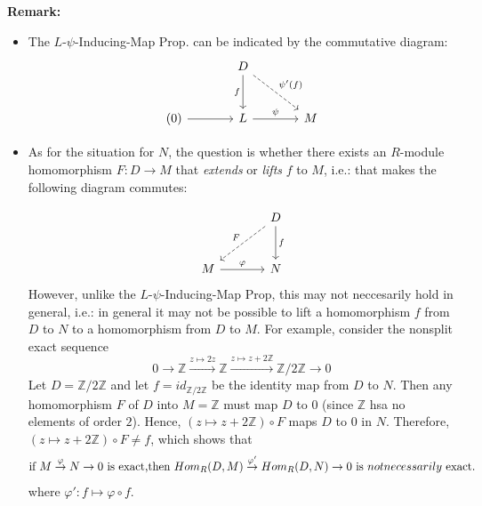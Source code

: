 \noindent\textbf{Remark:} \begin{itemize}
    \item The $L$-$\psi$-Inducing-Map Prop. can be indicated by the commutative diagram:
    \[
    \begin{tikzcd}[row sep=large, column sep=large]
    & D \arrow[d, "f"'] \arrow[rd, dashed, "\psi' (f)"] \\
    (0 \arrow[r]) & L \arrow[r, "\psi"] & M
    \end{tikzcd}
    \]

    \item As for the situation for $N$, the question is whether there exists an $R$-module homomorphism $F: D \to M$ that \textit{extends} or \textit{lifts} $f$ to $M$, i.e.: that makes the following diagram commutes:

    \[
    \begin{tikzcd}[row sep=large, column sep=large]
    & D \arrow[dl, dashed, "F"'] \arrow[d, "f"] \\
    M \arrow[r, "\varphi"] & N 
    \end{tikzcd}
    \]
    However, unlike the $L$-$\psi$-Inducing-Map Prop, this may not neccesarily hold in general, i.e.: in general it may not be possible to lift a homomorphism $f$ from $D$ to $N$ to a homomorphism from $D$ to $M$. For example, consider the nonsplit exact sequence
    $$0 \to \mathbb{Z} \overset{z \mapsto 2z}{\longrightarrow} \mathbb{Z} \overset{z \mapsto z+2\mathbb{Z}}{\longrightarrow} \mathbb{Z} /2 \mathbb{Z} \to 0$$
    Let $D=\mathbb{Z} /2\mathbb{Z}$ and let $f= id_{\mathbb{Z}/ 2\mathbb{Z}}$ be the identity map from $D$ to $N$. Then any homomorphism $F$ of $D$ into $M =\mathbb{Z}$ must map $D$ to $0$ (since $\mathbb{Z}$ hsa no elements of order $2$). Hence, $(z \mapsto z+2\mathbb{Z}) \circ F$ maps $D$ to $0$ in $N$. Therefore, $(z \mapsto z +2\mathbb{Z} ) \circ F \neq f$, which shows that
    \[
    \text{if } M \overset{\varphi}{\to} N\to 0 \text{ is exact,}\\
    \text{then } Hom_R(D,M) \overset{\varphi'}{\to} Hom_R(D,N) \to 0 \text{ is } not necessarily \text{ exact.}
    \]
    where $\varphi': f \mapsto \varphi \circ f$.
\end{itemize}


